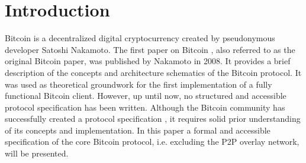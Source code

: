 \section{Introduction} \label{sec:Introduction}
Bitcoin is a decentralized digital cryptocurrency created by pseudonymous developer Satoshi Nakamoto. The first paper on Bitcoin \cite{Nakamoto_Bitcoin}, also referred to as the original Bitcoin paper, was published by Nakamoto in 2008. It provides a brief description of the concepts and architecture schematics of the Bitcoin protocol. It was used as theoretical groundwork for the first implementation of a fully functional Bitcoin client. However, up until now, no structured and accessible protocol specification has been written. Although the Bitcoin community has successfully created a protocol specification \cite{Wikipedia_ProtocolSpec}, it requires solid prior understanding of its concepts and implementation. In this paper a formal and accessible specification of the core Bitcoin protocol, i.e. excluding the P2P overlay network, will be presented.